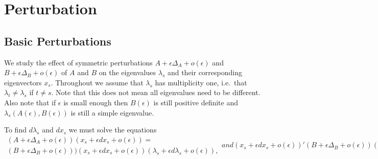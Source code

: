 \documentclass[
  12pt,
  letterpaper,
  DIV=11,
  numbers=noendperiod]{scrartcl}
\newcommand{\sectionbreak}{\clearpage}
\begin{document}
\sectionbreak

\section{Perturbation}\label{sec-perturb}

\subsection{Basic Perturbations}\label{sec-basic}

We study the effect of symmetric perturbations
\(A+\epsilon\Delta_A+o(\epsilon)\) and
\(B+\epsilon\Delta_B+o(\epsilon)\) of \(A\) and \(B\) on the eigenvalues
\(\lambda_s\) and their corresponding eigenvectors \(x_s\). Throughout
we assume that \(\lambda_s\) has multiplicity one, i.e.~that
\(\lambda_t\not=\lambda_s\) if \(t\not=s\). Note that this does not mean
all eigenvalues need to be different. Also note that if \(\epsilon\) is
small enough then \(B(\epsilon)\) is still positive definite and
\(\lambda_s(A(\epsilon),B(\epsilon))\) is still a simple eigenvalue.

To find \(d\lambda_s\) and \(dx_s\) we must solve the equations
\begin{subequations}
\begin{multline}
(A+\epsilon\Delta_A+o(\epsilon))(x_s+\epsilon dx_s+o(\epsilon))=\\(B+\epsilon\Delta_B+o(\epsilon)))(x_s+\epsilon dx_s+o(\epsilon))(\lambda_s+\epsilon d\lambda_s+o(\epsilon)),\label{eq-witheps1}
\end{multline}
and
\begin{equation}
(x_s+\epsilon dx_s+o(\epsilon))'(B+\epsilon\Delta_B+o(\epsilon))(x_s+\epsilon dx_s+o(\epsilon))=1.\label{eq-witheps2}
\end{equation}
\end{subequations}
\end{document}

